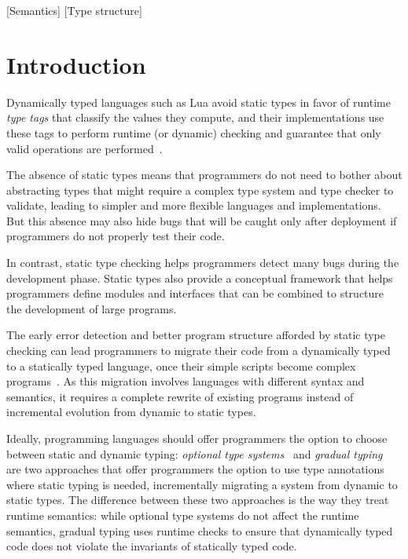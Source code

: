 \documentclass{sig-alternate}
\begin{document}
[Semantics]
[Type structure]


\section{Introduction} \label{sec:intro}

Dynamically typed languages such as Lua avoid static types in favor of
runtime {\em type tags} that classify the values they compute, and
their implementations use these tags to perform runtime (or dynamic)
checking and guarantee that only valid operations are
performed~\citep{pierce2002tpl}.

The absence of static types means that programmers do not need to
bother about abstracting types that might require a complex type
system and type checker to validate, leading to simpler and more flexible
languages and implementations. But this absence may also hide bugs
that will be caught only after deployment if programmers do not properly
test their code.

In contrast, static type checking helps programmers detect many 
bugs during the development phase. Static types also provide a
conceptual framework that helps programmers define modules
and interfaces that can be combined to structure the development
of large programs.

The early error detection and better program structure afforded by
static type checking can lead programmers to migrate their code from
a dynamically typed to a statically typed language, once their simple
scripts become complex programs~\citep{tobin-hochstadt2006ims}.
As this migration involves languages with different syntax and
semantics, it requires a complete rewrite of existing programs instead
of incremental evolution from dynamic to static types.

Ideally, programming languages should offer programmers the
option to choose between static and dynamic typing:
\textit{optional type systems}~\citep{bracha2004pluggable} and
\textit{gradual typing}~\citep{siek2006gradual} are two approaches
that offer programmers the option to use type annotations where static
typing is needed, incrementally migrating a system from dynamic
to static types. The difference between these two approaches is the
way they treat runtime semantics: while optional type systems
do not affect the runtime semantics,
gradual typing uses runtime checks to ensure that dynamically typed
code does not violate the invariants of statically typed code.
\end{document}
